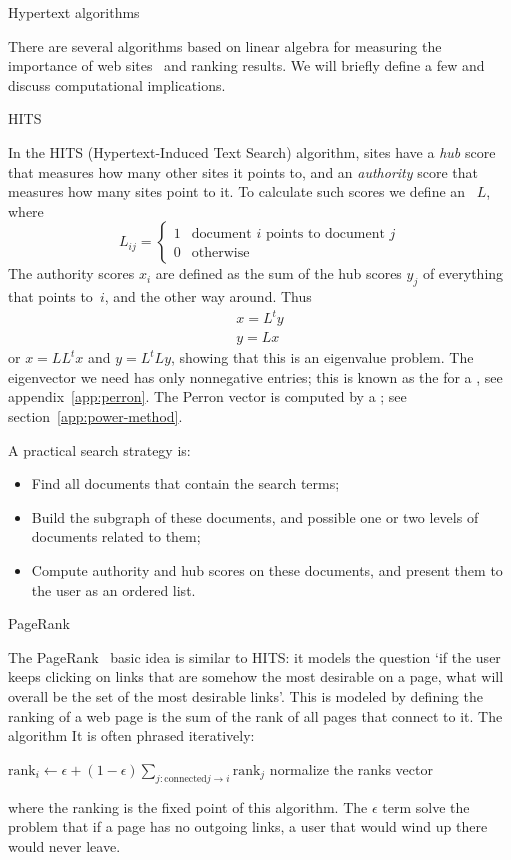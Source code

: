  {Hypertext algorithms}
\label{sec:pagerank}

There are several algorithms based on linear algebra
for measuring the importance of web
sites~\cite{Langville2005eigenvector}
and ranking  results.
We will briefly define a few
and discuss computational implications.

 {HITS}

In the HITS (Hypertext-Induced
Text Search) algorithm, sites have a \emph{hub} score that measures how many
other sites it points to, and an \emph{authority} score that measures
how many sites point to it. To calculate such scores we define an
~$L$, where
\[ L_{ij}=
\begin{cases}
  1&\mbox{document $i$ points to document $j$}\\
  0&\mbox{otherwise}
\end{cases}
\]
The authority scores $x_i$ are defined as the sum of the hub scores
$y_j$ of everything that points to~$i$, and the other way around. Thus
\[
\begin{array}{l}
  x=L^ty\\ y=Lx
\end{array}
\]
or $x=LL^tx$ and $y=L^tLy$, showing that this is an eigenvalue
problem. The eigenvector we need has only nonnegative entries; this is
known as the  for a
, see appendix~\ref{app:perron}. The
Perron vector is computed by a ; see
section~\ref{app:power-method}.

A practical search strategy is:
\begin{itemize}
\item Find all documents that contain the search terms;
\item Build the subgraph of these documents, and possible one or two
  levels of documents related to them;
\item Compute authority and hub scores on these documents, and present
  them to the user as an ordered list.
\end{itemize}


 {PageRank}

The PageRank~\cite{PageBrin:PageRank} basic idea is similar to
HITS:
it models the question
`if the user keeps clicking on links that are somehow the
most desirable on a page, what will overall be the set of the most
desirable links'. 
This is modeled by defining
the ranking of a web page is the sum of the rank of all pages
that connect to it. The algorithm It is often phrased iteratively:
%
\begin{displayalgorithm}
        { 
          {
            $\mathrm{rank}_i \leftarrow \epsilon +
            (1-\epsilon) \sum_{j\colon\mathrm{connected}j\rightarrow i}\mathrm{rank}_j$
          } \;
          normalize the ranks vector \;
        }
\end{displayalgorithm}
%
where the ranking is the fixed point of this algorithm.
The $\epsilon$ term solve the problem that if a page has
no outgoing links, a user that would wind up there would never
leave. 

